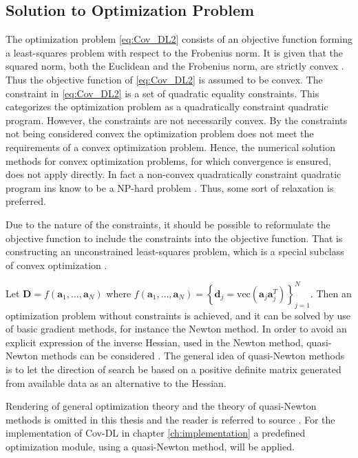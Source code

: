 \subsection{Solution to Optimization Problem}
The optimization problem \eqref{eq:Cov_DL2} consists of an objective function forming a least-squares problem with respect to the Frobenius norm. It is given that the squared norm, both the Euclidean and the Frobenius norm, are strictly convex \cite[p. 173]{norm_optimization}.
Thus the objective function of \eqref{eq:Cov_DL2} is assumed to be convex.
The constraint in \eqref{eq:Cov_DL2} is a set of quadratic equality constraints. 
This categorizes the optimization problem as a quadratically constraint quadratic program. 
However, the constraints are not necessarily convex. 
By the constraints not being considered convex the optimization problem does not meet the requirements of a convex optimization problem. Hence, the numerical solution methods for convex optimization problems, for which convergence is ensured, does not apply directly. In fact a non-convex quadratically constraint quadratic program ins know to be a NP-hard problem \cite{qcqp}. Thus, some sort of relaxation is preferred.  

Due to the nature of the constraints, it should be possible to reformulate the objective function to include the constraints into the objective function. That is constructing an unconstrained least-squares problem, which is a special subclass of convex optimization \cite{cvxbook}.

Let $\mathbf{D} = f\left(\mathbf{a}_1, \dots, \mathbf{a}_N\right)$ where $f\left(\mathbf{a}_1, \dots, \mathbf{a}_N\right) = \left\{\mathbf{d}_j = \text{vec}\left(\mathbf{a}_j \mathbf{a}_j^T\right) \right\}_{j=1}^{N}$. 
Then an optimization problem without constraints is achieved, and it can be solved by use of basic gradient methods, for instance the Newton method. In order to avoid an explicit expression of the inverse Hessian, used in the Newton method, quasi-Newton methods can be considered \cite{Optimization2007}. 
The general idea of quasi-Newton methods is to let the direction of search be based on a positive definite matrix generated from available data as an alternative to the Hessian. 

Rendering of general optimization theory and the theory of quasi-Newton methods is omitted in this thesis and the reader is referred to source \cite{Optimization2007}.
For the implementation of Cov-DL in chapter \ref{ch:implementation} a predefined optimization module, using a quasi-Newton method, will be applied.   
   


